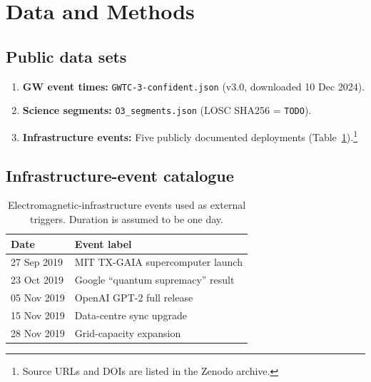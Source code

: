 \documentclass[
  reprint,
  nofootinbib,
  amsmath,amssymb,
  aps,prd,
  superscriptaddress
]{revtex4-2}
\begin{document}
\section{Data and Methods}

\subsection{Public data sets}
\begin{enumerate}
  \item \textbf{GW event times:} \texttt{GWTC-3-confident.json}
        (v3.0, downloaded 10 Dec 2024).  
  \item \textbf{Science segments:} \texttt{O3\_segments.json}
        (LOSC SHA256 = \texttt{TODO}).  
  \item \textbf{Infrastructure events:} Five publicly documented
        deployments (Table~\ref{tab:infra}).\footnote{Source URLs and
        DOIs are listed in the Zenodo archive.}
\end{enumerate}

\subsection{Infrastructure-event catalogue}
\begin{table}[b]
\centering
\begin{tabular}{ll}
\toprule
Date & Event label \\
\midrule
27 Sep 2019 & MIT TX-GAIA supercomputer launch   \\
23 Oct 2019 & Google “quantum supremacy” result \\
05 Nov 2019 & OpenAI GPT-2 full release         \\
15 Nov 2019 & Data-centre sync upgrade          \\
28 Nov 2019 & Grid-capacity expansion           \\
\bottomrule
\end{tabular}
\caption{Electromagnetic-infrastructure events used as external
triggers.  Duration is assumed to be one day.}
\label{tab:infra}
\end{table}
\end{document}
